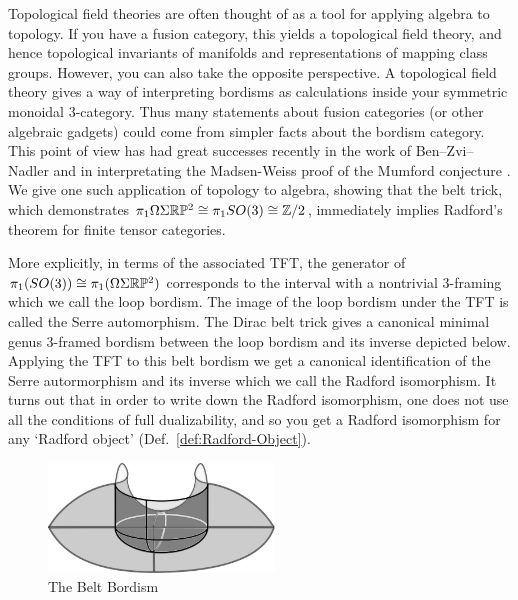 \documentclass{amsart}
\begin{document}
Topological field theories are often thought of as a tool for applying algebra to topology.  If you have a fusion category, this yields a topological field theory, and hence topological invariants of manifolds and representations of mapping class groups.  However, you can also take the opposite perspective.  A topological field theory gives a way of interpreting bordisms as calculations inside your symmetric monoidal $3$-category.  Thus many statements about fusion categories (or other algebraic gadgets) could come from simpler facts about the bordism category.  This point of view has had great successes recently in the work of Ben--Zvi--Nadler \cite{0904.1247} and in interpretating the Madsen-Weiss proof of the Mumford conjecture \cite{MR2335797, lurie-ch}.  We give one such application of topology to algebra, showing that the belt trick, which demonstrates $\pi_1 \Omega \Sigma \mathbb R \mathbb P^2 \cong \pi_1 SO(3) \cong \mathbb{Z}/2$, immediately implies Radford's theorem for finite tensor categories.

More explicitly, in terms of the associated TFT, the generator of $\pi_1(SO(3)) \cong \pi_1(\Omega \Sigma \mathbb R \mathbb P^2)$ corresponds to the interval with a nontrivial $3$-framing which we call the loop bordism.  The image of the loop bordism under the TFT is called the Serre automorphism.  The Dirac belt trick gives a canonical minimal genus $3$-framed bordism between the loop bordism and its inverse depicted below.  Applying the TFT to this belt bordism we get a canonical identification of the Serre autormorphism and its inverse which we call the Radford isomorphism.  It turns out that in order to write down the Radford isomorphism, one does not use all the conditions of full dualizability, and so you get a Radford isomorphism for any `Radford object' (Def.~\ref{def:Radford-Object}).  

\begin{figure}[htbp]
	\begin{center}
	\includegraphics[width=60mm]{cobordism.png}
	\end{center}
	\caption{The Belt Bordism}
	\label{fig:belt_bordism}
\end{figure}
\end{document}
